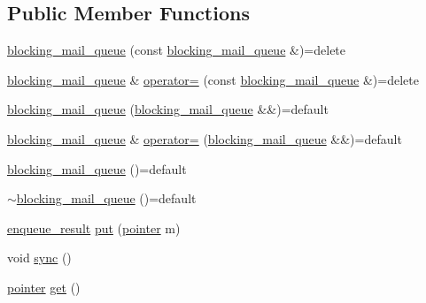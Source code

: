 \subsection*{Public Member Functions}
\begin{DoxyCompactItemize}
\item 
\hyperlink{classactor__zeta_1_1messaging_1_1blocking__mail__queue_a27b186a6995c984fda250ffaa8cdf207}{blocking\+\_\+mail\+\_\+queue} (const \hyperlink{classactor__zeta_1_1messaging_1_1blocking__mail__queue}{blocking\+\_\+mail\+\_\+queue} \&)=delete
\item 
\hyperlink{classactor__zeta_1_1messaging_1_1blocking__mail__queue}{blocking\+\_\+mail\+\_\+queue} \& \hyperlink{classactor__zeta_1_1messaging_1_1blocking__mail__queue_a595342b1b167fd4a889b6d3f2b533d7e}{operator=} (const \hyperlink{classactor__zeta_1_1messaging_1_1blocking__mail__queue}{blocking\+\_\+mail\+\_\+queue} \&)=delete
\item 
\hyperlink{classactor__zeta_1_1messaging_1_1blocking__mail__queue_a22fa153dcd1965874060e33bc88d61c0}{blocking\+\_\+mail\+\_\+queue} (\hyperlink{classactor__zeta_1_1messaging_1_1blocking__mail__queue}{blocking\+\_\+mail\+\_\+queue} \&\&)=default
\item 
\hyperlink{classactor__zeta_1_1messaging_1_1blocking__mail__queue}{blocking\+\_\+mail\+\_\+queue} \& \hyperlink{classactor__zeta_1_1messaging_1_1blocking__mail__queue_ae5041536a45ba1a1fa68a1ac91c407d5}{operator=} (\hyperlink{classactor__zeta_1_1messaging_1_1blocking__mail__queue}{blocking\+\_\+mail\+\_\+queue} \&\&)=default
\item 
\hyperlink{classactor__zeta_1_1messaging_1_1blocking__mail__queue_a0f37b3d45de05f79501f46bcb93fc92f}{blocking\+\_\+mail\+\_\+queue} ()=default
\item 
\hyperlink{classactor__zeta_1_1messaging_1_1blocking__mail__queue_a60c3eee1e67c1fd16b0898933d352cb3}{$\sim$blocking\+\_\+mail\+\_\+queue} ()=default
\item 
\hyperlink{namespaceactor__zeta_1_1messaging_ac2c5f2f473c5a97d779ec63a78d498a1}{enqueue\+\_\+result} \hyperlink{classactor__zeta_1_1messaging_1_1blocking__mail__queue_a738f8b8948ace649ab23b5fb312bf3da}{put} (\hyperlink{classactor__zeta_1_1messaging_1_1blocking__mail__queue_a64432628c6a91d330431fc3299021045}{pointer} m)
\item 
void \hyperlink{classactor__zeta_1_1messaging_1_1blocking__mail__queue_a26fa1043b83e6956362282989cb18f3d}{sync} ()
\item 
\hyperlink{classactor__zeta_1_1messaging_1_1blocking__mail__queue_a64432628c6a91d330431fc3299021045}{pointer} \hyperlink{classactor__zeta_1_1messaging_1_1blocking__mail__queue_ab5d259cfddb68ab54eb7402c61e980b8}{get} ()

\end{DoxyCompactItemize}
